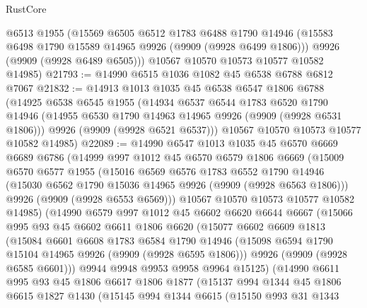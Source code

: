 \begin{lexlean}{RustCore}
\begin{coremodule}
      @6513
      @1955
      (@15569
        @6505
        @6512
        @1783
        @6488
        @1790
        @14946
        (@15583 @6498 @1790 @15589 @14965 @9926 (@9909 (@9928 @6499 @1806)))
        @9926
        (@9909 (@9928 @6489 @6505)))
      @10567
      @10570
      @10573
      @10577
      @10582
      @14985)
@21793 := @14990 @6515 @1036 @1082 @45 @6538 @6788 @6812 @7067
@21832 := @14913
    @1013
    @1035
    @45
    @6538
    @6547
    @1806
    @6788
    (@14925
      @6538
      @6545
      @1955
      (@14934
        @6537
        @6544
        @1783
        @6520
        @1790
        @14946
        (@14955 @6530 @1790 @14963 @14965 @9926 (@9909 (@9928 @6531 @1806)))
        @9926
        (@9909 (@9928 @6521 @6537)))
      @10567
      @10570
      @10573
      @10577
      @10582
      @14985)
@22089 := @14990
    @6547
    @1013
    @1035
    @45
    @6570
    @6669
    @6689
    @6786
    (@14999
      @997
      @1012
      @45
      @6570
      @6579
      @1806
      @6669
      (@15009
        @6570
        @6577
        @1955
        (@15016
          @6569
          @6576
          @1783
          @6552
          @1790
          @14946
          (@15030 @6562 @1790 @15036 @14965 @9926 (@9909 (@9928 @6563 @1806)))
          @9926
          (@9909 (@9928 @6553 @6569)))
        @10567
        @10570
        @10573
        @10577
        @10582
        @14985)
      (@14990
        @6579
        @997
        @1012
        @45
        @6602
        @6620
        @6644
        @6667
        (@15066
          @995
          @93
          @45
          @6602
          @6611
          @1806
          @6620
          (@15077
            @6602
            @6609
            @1813
            (@15084
              @6601
              @6608
              @1783
              @6584
              @1790
              @14946
              (@15098 @6594 @1790 @15104 @14965 @9926 (@9909 (@9928 @6595 @1806)))
              @9926
              (@9909 (@9928 @6585 @6601)))
            @9944
            @9948
            @9953
            @9958
            @9964
            @15125)
          (@14990
            @6611
            @995
            @93
            @45
            @1806
            @6617
            @1806
            @1877
            (@15137
              @994
              @1344
              @45
              @1806
              @6615
              @1827
              @1430
              (@15145
                @994
                @1344
                @6615
                (@15150
                  @993
                  @31
                  @1343

\end{coremodule}
\end{lexlean}
